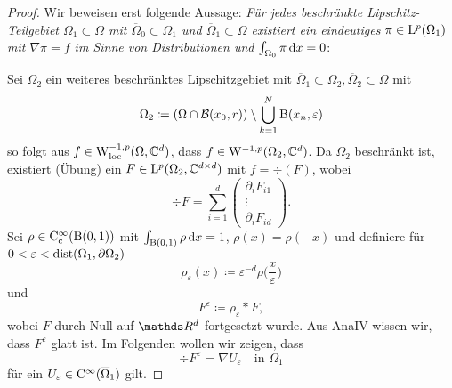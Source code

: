 \begin{proof}
  Wir beweisen erst folgende Aussage: \emph{Für jedes beschränkte Lipschitz-Teilgebiet $\Omega_1 \subset \Omega$ mit $\overline\Omega_0 \subset \Omega_1$ und $\overline\Omega_1 \subset \Omega$ existiert ein eindeutiges $\pi \in \mathrm{L}^p(\Omega_1)$ mit $\nabla\pi = f$ im Sinne von Distributionen und $\int_{\Omega_0} \pi \, {\operatorname{d}\!{x}} = 0$}:

  Sei $\Omega_2$ ein weiteres beschränktes Lipschitzgebiet mit $\overline\Omega_1 \subset \Omega_2, \overline\Omega_2 \subset \Omega$ mit 
  $$
  \Omega_2 \coloneqq (\Omega \cap \mathcal{B}(x_0, r)) \setminus \bigcup_{k = 1}^N \mathrm{B}(x_n , \varepsilon)
  $$
  so folgt aus $f \in \mathrm{W}_{\operatorname{loc}}^{-1,p}(\Omega, \mathbb{C}^d)$, dass $f \in \mathrm{W}^{-1,p}(\Omega_2, \mathbb{C}^d)$.
  Da $\Omega_2$ beschränkt ist, existiert (Übung) ein $F \in \mathrm{L}^p(\Omega_2, \mathbb{C}^{d\times d})$ mit $f = \div(F)$, wobei
  $$
  \div F = \sum_{i = 1}^d \left( \begin{array}{c} \partial_i F_{i1} \\ \vdots \\ \partial_i F_{id} \end{array} \right).
  $$
  Sei $\rho \in \mathrm{C}_{\mathrm{c}}^\infty(\mathrm{B}(0,1))$ mit $\int_{\mathrm{B}(0,1)} \rho \, {\operatorname{d}\!{x}} = 1$, $\rho(x) = \rho(-x)$ und definiere für $0 < \varepsilon < \operatorname{dist}(\Omega_1, \partial\Omega_2)$
  $$
  \rho_\varepsilon(x) \coloneqq \varepsilon^{-d} \rho\Big(\frac{x}{\varepsilon}\Big)
  $$
  und
  $$
  F^\varepsilon \coloneqq \rho_\varepsilon \ast F,
  $$
  wobei $F$ durch Null auf $\R^d$ fortgesetzt wurde.
  Aus AnaIV wissen wir, dass $F^\varepsilon$ glatt ist.
  Im Folgenden wollen wir zeigen, dass 
  $$
  \div F^\varepsilon = \nabla U_\varepsilon \quad\text{in } \Omega_1
  $$
  für ein $U_\varepsilon \in \mathrm{C}^\infty(\overline\Omega_1)$ gilt.


\end{proof}

